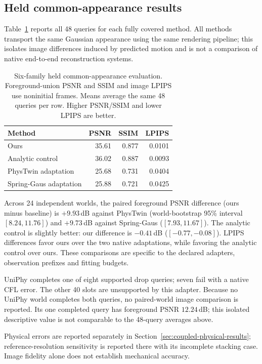 \subsection{Held common-appearance results}
\label{sec:coupled-appearance-results}
Table~\ref{tab:coupled-appearance} reports all 48 queries for each fully covered method. All methods transport the same Gaussian appearance using the same rendering pipeline; this isolates image differences induced by predicted motion and is not a comparison of native end-to-end reconstruction systems.
\begin{table}[t]
\centering\small
\caption{Six-family held common-appearance evaluation. Foreground-union PSNR and SSIM and image LPIPS use noninitial frames. Means average the same 48 queries per row. Higher PSNR/SSIM and lower LPIPS are better.}
\label{tab:coupled-appearance}
\begin{tabular}{lrrr}
\toprule Method & PSNR & SSIM & LPIPS \\
\midrule
Ours & 35.61 & 0.877 & 0.0101 \\
Analytic control & 36.02 & 0.887 & 0.0093 \\
PhysTwin adaptation & 25.68 & 0.731 & 0.0404 \\
Spring-Gaus adaptation & 25.88 & 0.721 & 0.0425 \\
\bottomrule
\end{tabular}
\end{table}
Across 24 independent worlds, the paired foreground PSNR difference (ours minus baseline) is $+9.93$\,dB against PhysTwin (world-bootstrap 95\% interval $[8.24,11.76]$) and $+9.73$\,dB against Spring-Gaus ($[7.93,11.67]$). The analytic control is slightly better: our difference is $-0.41$\,dB ($[-0.77,-0.08]$). LPIPS differences favor ours over the two native adaptations, while favoring the analytic control over ours. These comparisons are specific to the declared adapters, observation prefixes and fitting budgets.

UniPhy completes one of eight supported drop queries; seven fail with a native CFL error. The other 40 slots are unsupported by this adapter. Because no UniPhy world completes both queries, no paired-world image comparison is reported. Its one completed query has foreground PSNR $12.24$\,dB; this isolated descriptive value is not comparable to the 48-query averages above.

Physical errors are reported separately in Section~\ref{sec:coupled-physical-results}; reference-resolution sensitivity is reported there with its incomplete stacking case. Image fidelity alone does not establish mechanical accuracy.

